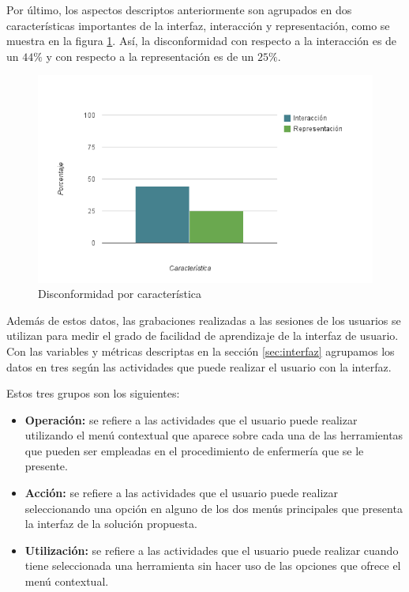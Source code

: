 Por último, los aspectos descriptos anteriormente son agrupados en dos características importantes de la interfaz, interacción y representación, como se muestra en la figura \ref{fig:interfaz_disconformidad_caracteristica}.  Así, la disconformidad con respecto a la interacción es de un  $44\%$ y con respecto a la representación es de un  $25\%$. 

\begin{figure}[ht!]
\centering
\includegraphics[scale=0.8]{resultados/imagenes/interfaz_disconformidad_caracteristica.png}
\caption{Disconformidad por característica}
\label{fig:interfaz_disconformidad_caracteristica}
\end{figure}



Además de estos datos, las grabaciones realizadas a las sesiones de los usuarios se utilizan para medir el grado de facilidad de aprendizaje de la interfaz de usuario. Con las variables y métricas descriptas en la sección \ref{sec:interfaz} agrupamos los datos
en tres según las actividades que puede realizar el usuario con la interfaz.

Estos tres grupos son los siguientes: 

\begin{itemize}
\item \textbf{Operación:} se refiere a las actividades que el usuario puede realizar utilizando el menú contextual que aparece sobre cada una de las herramientas que pueden ser empleadas en el procedimiento de enfermería que se le presente.
\item \textbf{Acción:} se refiere a las actividades que el usuario puede realizar seleccionando una opción en alguno de los dos menús principales que presenta la interfaz de la solución propuesta.
\item \textbf{Utilización:} se refiere a las actividades que el usuario puede realizar cuando tiene seleccionada una herramienta sin hacer uso de las opciones que ofrece el menú contextual.
\end{itemize}

